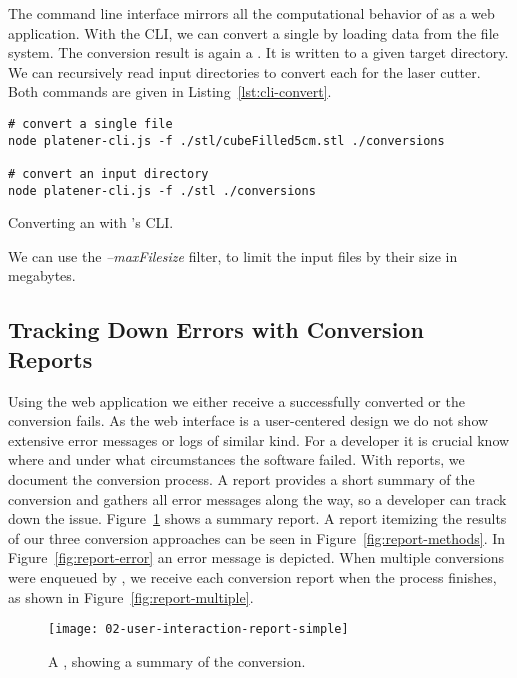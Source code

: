 \documentclass[../ClassicThesis.tex]{subfiles}
\begin{document}
The command line interface mirrors all the computational behavior of
{\platener} as a web application. With the CLI, we can convert a
single {\threedmodel} by loading data from the file system. The
conversion result is again a {\zipfile}. It is written to a given
target directory. We can recursively read input directories to
convert each {\stlfile} for the laser cutter. Both commands are given
in Listing~\ref{lst:cli-convert}.


\begin{listing}[!h]
\begin{verbatim}
# convert a single file
node platener-cli.js -f ./stl/cubeFilled5cm.stl ./conversions

# convert an input directory
node platener-cli.js -f ./stl ./conversions
\end{verbatim}
\caption{Converting an {\stlfile} with {\platener}'s CLI.}
\label{lst:cli-convert}
\end{listing}

We can use the \emph{--maxFilesize} filter, to limit the
input files by their size in megabytes.

\subsection{Tracking Down Errors with Conversion Reports}
\label{sec:walkthrough-cli-reports}

Using the web application we either receive a successfully converted
{\svgfile} or the conversion fails. As the web interface is a
user-centered design we do not show extensive error messages or logs
of similar kind. For a developer it is crucial know where and under what
circumstances the software failed. With reports, we document the
conversion process. A report provides a short summary of the
conversion and gathers all error messages along the way, so a
developer can track down the issue. Figure~\ref{fig:report-simple}
shows a summary report. A report itemizing the results of our three
conversion approaches can be seen in Figure~\ref{fig:report-methods}.
In Figure~\ref{fig:report-error} an error message is depicted. When
multiple conversions were enqueued by {\platener}, we receive each
conversion report when the process finishes, as shown in
Figure~\ref{fig:report-multiple}.

\begin{figure}
  \centering
  \texttt{[image: 02-user-interaction-report-simple]}
  \caption{A , showing a summary of the conversion.}
  \label{fig:report-simple}
\end{figure}
\end{document}
